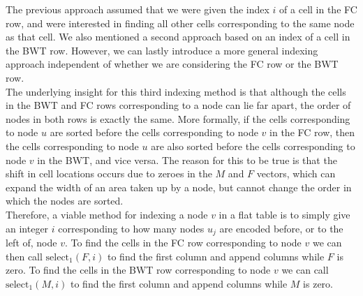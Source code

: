 \documentclass[a4paper,12pt,twoside,BCOR=10mm]{scrbook}
\begin{document}
The previous approach assumed that we were given the index $ i $ of a cell in the FC row, 
and were interested in finding all other cells corresponding to the same node as that cell. 
We also mentioned a second approach based on an index of a cell in the BWT row. 
However, we can lastly introduce a more general indexing approach independent of whether we 
are considering the FC row or the BWT row. \\
The underlying insight for this third indexing method is that although the cells in the BWT 
and FC rows corresponding to a node can lie far apart, the order of nodes in both rows is exactly the same. 
More formally, if the cells corresponding to node $ u $ are sorted before the cells corresponding to node $ v $ in 
the FC row, then the cells corresponding to node $ u $ are also sorted before the cells corresponding to node $ v $ in 
the BWT, and vice versa. The reason for this to be true is that the shift in cell locations occurs due to zeroes in 
the $ M $ and $ F $ vectors, which can expand the width of an area taken up by a node, but cannot change the order 
in which the nodes are sorted. \\
Therefore, a viable method for indexing a node $ v $ in a flat table 
is to simply give an integer $ i $ corresponding to how many nodes $ u_j $ are encoded before, or to 
the left of, node $ v $. 
To find the cells in the FC row corresponding to node $ v $ we can then call $ \textrm{select}_1 ( F, i ) $ to 
find the first column and append columns while $ F $ is zero. 
To find the cells in the BWT row corresponding to node $ v $ we can call $ \textrm{select}_1 ( M, i ) $ to 
find the first column and append columns while $ M $ is zero.
\end{document}
